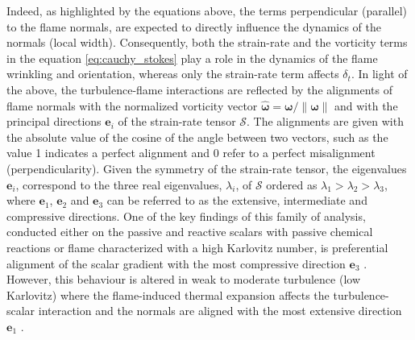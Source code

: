 %
Indeed, as highlighted by the equations above, the terms perpendicular (parallel) to the flame
normals, are expected to directly influence the dynamics of the normals (local width).
%
Consequently, both the strain-rate and the vorticity terms in the equation \eqref{eq:cauchy_stokes}
play a role in the dynamics of the flame wrinkling and orientation, whereas only the strain-rate
term affects $\delta_t$.
%
In light of the above, the turbulence-flame interactions are reflected by the alignments of flame 
normals with the normalized vorticity vector $\hat{\boldsymbol{\omega}} = \boldsymbol{\omega}/\|\boldsymbol{\omega}\|$ and with the principal directions $\mathbf{e}_i$ of the strain-rate tensor $\boldsymbol{\mathcal{S}}$.
%
The alignments are given with the absolute value of the cosine of the angle between two vectors,
such as the value 1 indicates a perfect alignment and 0 refer to a perfect misalignment 
(perpendicularity).
%
Given the symmetry of the strain-rate tensor, the eigenvalues $\mathbf{e}_i$, correspond to the
three real eigenvalues, $\lambda_i$, of $\boldsymbol{\mathcal{S}}$ ordered as $
\lambda_1>\lambda_2>\lambda_3$, where $\mathbf{e}_1$, $\mathbf{e}_2$ and $\mathbf{e}_3$ can be 
referred to as the extensive, intermediate and compressive directions.
%
One of the key findings of this family of analysis, conducted either on the passive and reactive 
scalars with passive chemical reactions or flame characterized with a high Karlovitz number,  
is preferential alignment of the scalar gradient with the most compressive direction 
$\mathbf{e}_3$ \cite{ashurst1987alignment,rutland1993direct,kim2007scalar,chakraborty2007influence,hamlington2011interactions,hartung2008effect,swaminathan2006interaction}.
%
However, this behaviour is altered in weak to moderate turbulence (low Karlovitz) where the 
flame-induced thermal expansion affects the turbulence-scalar interaction and the normals are
aligned with the most extensive direction $\mathbf{e}_1$ \cite{chakraborty2007influence,
cifuentes2014local,chakraborty2007comparison}.\\


